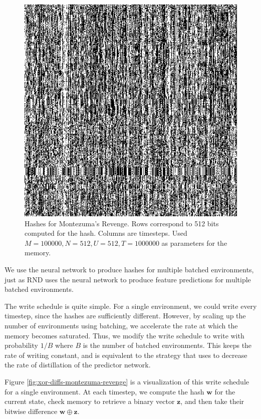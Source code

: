 \documentclass[journal, onecolumn, 12pt, draftclsnofoot]{IEEEtran}
\newcommand{\mbf}[1]{\mathbf{#1}}
\begin{document}
	\begin{figure}[ht]
		\begin{center}
		\includegraphics[scale=0.75]{fig/MontezumeRevenge-v0-hashes.jpg}
	\end{center}
		\caption{Hashes for Montezuma's Revenge. Rows correspond to 512 bits computed for the hash. Columns are timesteps. Used $M = 100000, N=512, U=512, T=1000000$ as parameters for the memory.}
		\label{fig:hashes-montezuma-revenge}
	\end{figure}
	\par We use the neural network to produce hashes for multiple batched environments, just as RND uses the neural network to produce feature predictions for multiple batched environments.
	\par The write schedule is quite simple. For a single environment, we could write every timestep, since the hashes are sufficiently different. However, by scaling up the number of environments using batching, we accelerate the rate at which the memory becomes saturated. Thus, we modify the write schedule to write with probability $1/B$ where $B$ is the number of batched environments. This keeps the rate of writing constant, and is equivalent to the strategy that \cite{rnd} uses to decrease the rate of distillation of the predictor network.
	\par Figure \ref{fig:xor-diffs-montezuma-revenge} is a visualization of this write schedule for a single environment. At each timestep, we compute the hash $\mbf{w}$ for the current state, check memory to retrieve a binary vector $\mbf{z}$, and then take their bitwise difference $\mbf{w} \oplus \mbf{z}$.
\end{document}
